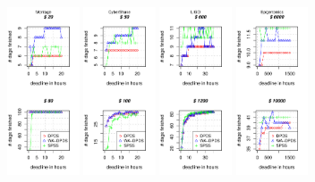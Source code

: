 \documentclass{sig-alternate}
\begin{document}
\begin{figure}[t] 
\centering
\includegraphics[width=0.19\textwidth]{figures/pareto-MONTAGE-n-1000-8-dagh1-20m0.pdf}
\includegraphics[width=0.19\textwidth]{figures/pareto-CYBERSHAKE-n-1000-8-dagh1-20m0.pdf}
\includegraphics[width=0.19\textwidth]{figures/pareto-LIGO-n-1000-8-dagh1-40m0.pdf}
\includegraphics[width=0.19\textwidth]{figures/pareto-GENOME-n-1000-8-dagh100-1500m0.pdf}

\end{figure}
\end{document}
